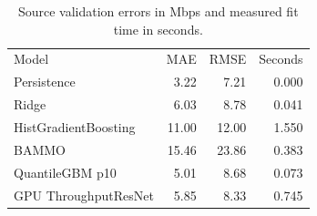 \begin{table}[!ht]
\centering\small
\caption{Source validation errors in Mbps and measured fit time in seconds.}
\begin{tabular}{lrrr}
\hline
Model & MAE & RMSE & Seconds \\
Persistence & 3.22 & 7.21 & 0.000 \\
Ridge & 6.03 & 8.78 & 0.041 \\
HistGradientBoosting & 11.00 & 12.00 & 1.550 \\
BAMMO & 15.46 & 23.86 & 0.383 \\
QuantileGBM p10 & 5.01 & 8.68 & 0.073 \\
GPU ThroughputResNet & 5.85 & 8.33 & 0.745 \\
\hline
\end{tabular}
\end{table}
